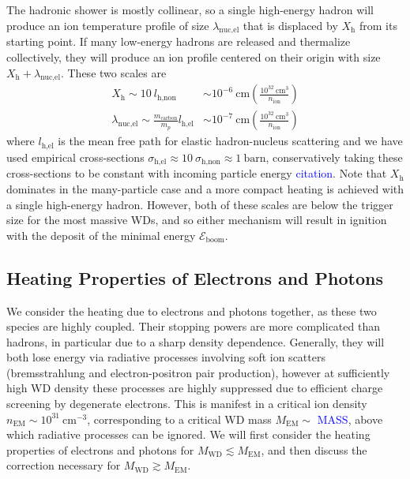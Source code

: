 \documentclass[twocolumn,showpacs,preprintnumbers,amsmath,amssymb,prd]{revtex4}
\newcommand{\Eboom}{\mathcal{E}_\text{boom}}
\def\r{\right)}
\def\l{\left(}
\begin{document}
The hadronic shower is mostly collinear, so a single high-energy hadron will produce an ion temperature profile of size $\lambda_\text{nuc,el}$ that is displaced by $X_\text{h}$ from its starting point. 
If many low-energy hadrons are released and thermalize collectively, they will produce an ion profile centered on their origin with size $X_\text{h} + \lambda_\text{nuc,el}$.
These two scales are
\begin{align}
  X_\text{h} \sim 10 ~l_\text{h,non}
  &\sim 10^{-6} ~\text{cm} \l\frac{10^{32}~\text{cm}^3}{n_\text{ion}}\r \\ 
  \lambda_\text{nuc,el} \sim \frac{m_\text{carbon}}{m_p} l_\text{h,el}  
  &\sim  10^{-7} ~\text{cm} \l\frac{10^{32}~\text{cm}^3}{n_\text{ion}}\r
\end{align}
where $l_\text{h,el}$ is the mean free path for elastic hadron-nucleus scattering and we have used empirical cross-sections $\sigma_\text{h,el} \approx 10~\sigma_\text{h,non} \approx 1~\text{barn}$, conservatively taking these cross-sections to be constant with incoming particle energy \textcolor{blue}{citation}.
Note that $X_\text{h}$ dominates in the many-particle case and a more compact heating is achieved with a single high-energy hadron. 
However, both of these scales are below the trigger size for the most massive WDs, and so either mechanism will result in ignition with the deposit of the minimal energy $\Eboom$. 

\subsection{Heating Properties of Electrons and Photons}

We consider the heating due to electrons and photons together, as these two species are highly coupled. 
Their stopping powers are more complicated than hadrons, in particular due to a sharp density dependence. 
Generally, they will both lose energy via radiative processes involving soft ion scatters (bremsstrahlung and electron-positron pair production), however at sufficiently high WD density these processes are highly suppressed due to efficient charge screening by degenerate electrons.  
This is manifest in a critical ion density $n_\text{EM} \sim 10^{31} ~\text{cm}^{-3}$, corresponding to a critical WD mass $M_\text{EM} \sim $ \textcolor{blue}{MASS}, above which radiative processes can be ignored. 
We will first consider the heating properties of electrons and photons for $M_\text{WD} \lesssim M_\text{EM}$, and then discuss the correction necessary for $M_\text{WD} \gtrsim M_\text{EM}$.
 
\end{document}
